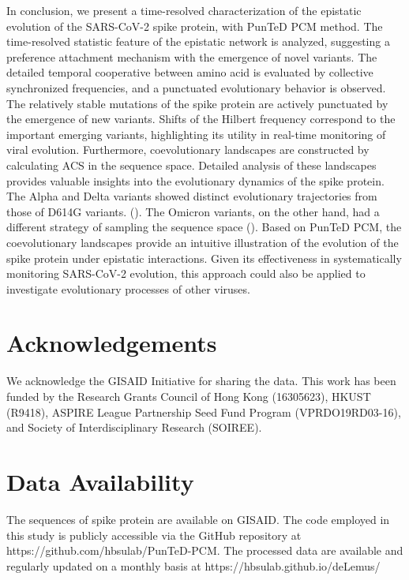\documentclass{sysbio}%
\begin{document}
In conclusion, we present a time-resolved characterization of the epistatic evolution of the SARS-CoV-2 spike protein, with PunTeD PCM method. The time-resolved statistic feature of the epistatic network is analyzed, suggesting a preference attachment mechanism with the emergence of novel variants. The detailed temporal cooperative between amino acid is evaluated by collective synchronized frequencies, and a punctuated evolutionary behavior is observed. The relatively stable mutations of the spike protein are actively punctuated by the emergence of new variants. Shifts of the Hilbert frequency correspond to the important emerging variants, highlighting its utility in real-time monitoring of viral evolution. %
Furthermore, coevolutionary landscapes are constructed by calculating ACS in the sequence space. Detailed analysis of these landscapes provides valuable insights into the evolutionary dynamics of the spike protein. The Alpha and Delta variants showed distinct evolutionary trajectories from those of D614G variants. (\cite{delta_neuta,N501Y_binding}). The Omicron variants, on the other hand, had a different strategy of sampling the sequence space (\cite{omi_alert,omi_anti_escape}). Based on PunTeD PCM, the coevolutionary landscapes provide an intuitive illustration of the evolution of the spike protein under epistatic interactions. Given its effectiveness in systematically monitoring SARS-CoV-2 evolution, this approach could also be applied to investigate evolutionary processes of other viruses. 

\section{Acknowledgements}

We acknowledge the GISAID Initiative for sharing the data. This work has been funded by the Research Grants Council of Hong Kong (16305623), HKUST (R9418), ASPIRE League Partnership Seed Fund Program (VPRDO19RD03-16), and Society of Interdisciplinary Research (SOIREE).  

\section{Data Availability}

The sequences of spike protein are available on GISAID. The code employed in this study is publicly accessible via the GitHub repository at https://github.com/hbsulab/PunTeD-PCM. The processed data are available and regularly updated on a monthly basis at https://hbsulab.github.io/deLemus/
\end{document}
